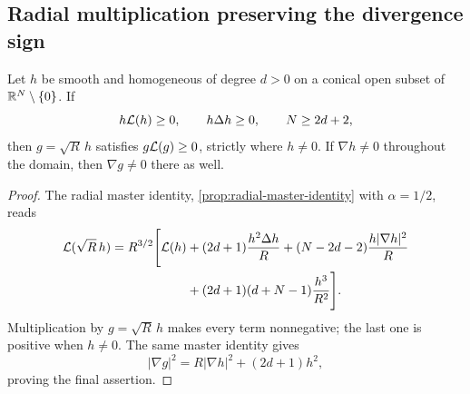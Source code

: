 \subsection{Radial multiplication preserving the divergence sign}

\begin{proposition}
\label{prop:cubic-radial-lift}
Let \(h\) be smooth and homogeneous of degree \(d>0\) on a conical
open subset of \(\mathbb R^N\setminus\{0\}\). If
\[
 h\mathcal L(h)\ge0,\qquad h\Delta h\ge0,\qquad N\ge2d+2,
\]
then \(g=\sqrt R\,h\) satisfies \(g\mathcal L(g)\ge0\), strictly where
\(h\ne0\). If \(\nabla h\ne0\) throughout the domain, then
\(\nabla g\ne0\) there as well.
\end{proposition}

\begin{proof}
The radial master identity, \cref{prop:radial-master-identity} with
\(\alpha=1/2\), reads
\begin{align}
 \mathcal L(\sqrt R\,h)=R^{3/2}\Biggl[\mathcal L(h)
 &+(2d+1)\frac{h^2\Delta h}{R}
 +(N-2d-2)\frac{h|\nabla h|^2}{R}\notag\\
 &+(2d+1)(d+N-1)\frac{h^3}{R^2}\Biggr].
 \label{eq:cubic-radial-lift}
\end{align}
Multiplication by \(g=\sqrt R\,h\) makes every term nonnegative;
the last one is positive when \(h\ne0\). The same master identity
gives
\[
 |\nabla g|^2=R|\nabla h|^2+(2d+1)h^2,
\]
proving the final assertion.
\end{proof}
